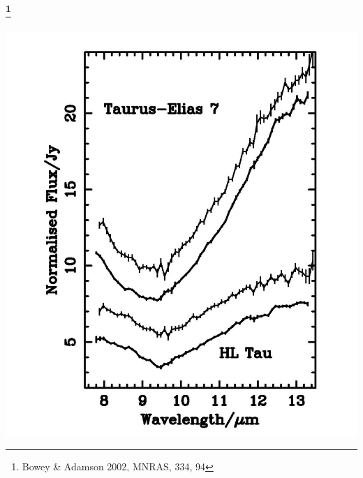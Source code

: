 \begin{frame}\frametitle{\footnote{Bowey \& Adamson 2002, MNRAS, 334, 94}}

\begin{minipage}[t]{0.3\textwidth}
\vspace{0.5cm}
  \begin{center}
\includegraphics[width=\textwidth,height=!]{./D/bowey_spectra.jpg}
    \end{center}
\end{minipage}
\hfill
\begin{minipage}[t]{0.3\textwidth}
\vspace{-1.0cm}
  \begin{center}

\end{center}
\end{minipage}
\end{frame}
